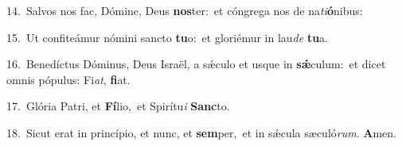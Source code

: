 {\numbfont\textcolor{\numbcolor}{14.}}~Salvos nos fac, Dómine, Deus \textbf{nos}\-ter:~\star et cóngrega nos de na\-\textit{ti}\-\textbf{ó}nibus:\par
{\numbfont\textcolor{\numbcolor}{15.}}~Ut confiteámur nómini sancto \textbf{tu}\-o:~\star et gloriémur in lau\textit{de} \textbf{tu}\-a.\par
{\numbfont\textcolor{\numbcolor}{16.}}~Benedíctus Dóminus, Deus Israël, a sǽculo et usque in \textbf{sǽ}\-culum:~\star et dicet omnis pópulus: Fi\-\textit{at}\-, \textbf{fi}\-at.\par
{\numbfont\textcolor{\numbcolor}{17.}}~Glória Patri, et \textbf{Fí}\-lio,~\star et Spirítu\textit{i} \textbf{Sanc}\-to.\par
{\numbfont\textcolor{\numbcolor}{18.}}~Sicut erat in princípio, et nunc, et \textbf{sem}\-per,~\star et in sǽcula sæculó\-\textit{rum}\-. \textbf{A}\-men.\par
